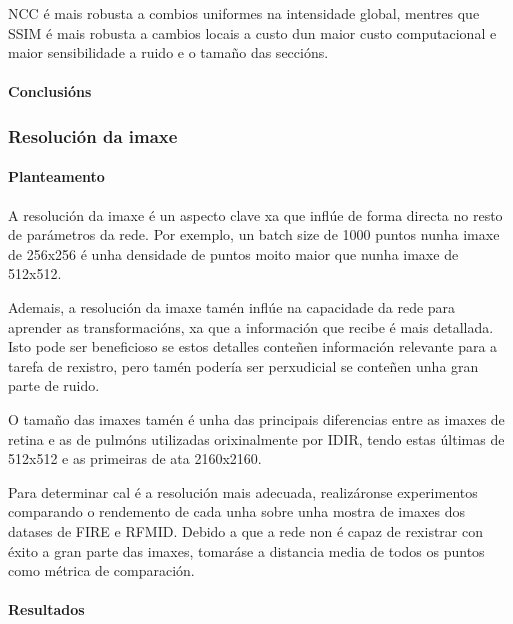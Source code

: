 NCC é mais robusta a combios uniformes na intensidade global, mentres que SSIM é mais robusta a cambios locais a custo dun maior custo computacional e maior sensibilidade a ruido e o tamaño das seccións.

\paragraph{Conclusións}
\label{par:Conclusións}

\subsubsection{Resolución da imaxe}
\label{subsubsec:Resolución da imaxe}

\paragraph{Planteamento}
\label{par:Planteamento}

A resolución da imaxe é un aspecto clave xa que inflúe de forma directa no resto de parámetros da rede.
Por exemplo, un batch size de 1000 puntos nunha imaxe de 256x256 é unha densidade de puntos moito maior que nunha imaxe de 512x512.

Ademais, a resolución da imaxe tamén inflúe na capacidade da rede para aprender as transformacións, xa que a información que recibe é mais detallada. 
Isto pode ser beneficioso se estos detalles conteñen información relevante para a tarefa de rexistro, pero tamén podería ser perxudicial se conteñen unha gran parte de ruido.

O tamaño das imaxes tamén é unha das principais diferencias entre as imaxes de retina e as de pulmóns utilizadas orixinalmente por IDIR, tendo estas últimas de 512x512 e as primeiras de ata 2160x2160.

Para determinar cal é a resolución mais adecuada, realizáronse experimentos comparando o rendemento de cada unha sobre unha mostra de imaxes dos datases de FIRE e RFMID.
Debido a que a rede non é capaz de rexistrar con éxito a gran parte das imaxes, tomaráse a distancia media de todos os puntos como métrica de comparación.

\paragraph{Resultados}
\label{par:Resultados}

